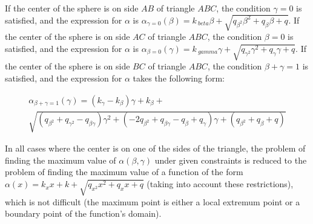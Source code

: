 \documentclass[
11pt,%
tightenlines,%
twoside,%
onecolumn,%
nofloats,%
nobibnotes,%
nofootinbib,%
superscriptaddress,%
noshowpacs,%
centertags]%
{revtex4}
\begin{document}
If the center of the sphere is on side $AB$ of triangle $ABC$, the condition $\gamma = 0$ is satisfied, and the expression for $\alpha$ is $\alpha_{\gamma = 0}(\beta) = k_{\ beta} \beta + \sqrt{q_{\beta^2} \beta^2 + q_{\beta} \beta + q}$.
If the center of the sphere is on side $AC$ of triangle $ABC$, the condition $\beta = 0$ is satisfied, and the expression for $\alpha$ is $\alpha_{\beta = 0}(\gamma) = k_{\ gamma} \gamma + \sqrt{q_{\gamma^2} \gamma^2 + q_{\gamma} \gamma + q}$.
If the center of the sphere is on side $BC$ of triangle $ABC$, the condition $\beta + \gamma = 1$ is satisfied, and the expression for $\alpha$ takes the following form:

\begin{multline}
\alpha_{\beta + \gamma = 1}(\gamma) = (k_{\gamma} - k_{\beta}) \gamma + k_{\beta} + \\
\sqrt{(q_{\beta^2} + q_{\gamma^2} - q_{\beta \gamma}) \gamma^2 + (-2 q_{\beta^2} + q_{\beta \gamma} - q_{\beta} + q_{\gamma}) \gamma + (q_{\beta^2} + q_{\beta} + q)}
\end{multline}

In all cases where the center is on one of the sides of the triangle, the problem of finding the maximum value of $\alpha(\beta, \gamma)$ under given constraints is reduced to the problem of finding the maximum value of a function of the form $\alpha(x) = k_x x + k + \sqrt {q_{x^2} x^2 + q_x x + q}$ (taking into account these restrictions), which is not difficult (the maximum point is either a local extremum point or a boundary point of the function's domain).
\end{document}
